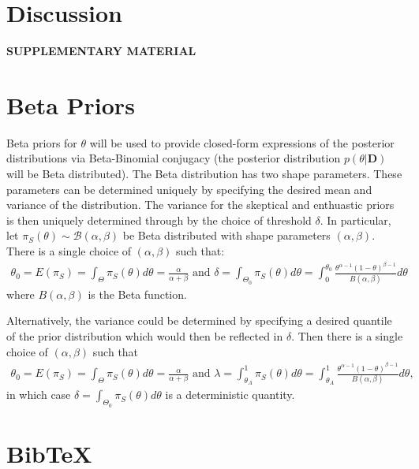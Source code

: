 \documentclass[12pt]{article}
\begin{document}
\section{Discussion}
%





\newpage
\begin{center}
{\large\bf SUPPLEMENTARY MATERIAL}
\end{center}
\section{Beta Priors}
Beta priors for $\theta$ will be used to provide closed-form expressions of the posterior distributions via Beta-Binomial conjugacy (the posterior distribution $p(\theta|\mathbf{D})$ will be Beta distributed). The Beta distribution has two shape parameters. These parameters can be determined uniquely by specifying the desired mean and variance of the distribution.  The variance for the skeptical and enthuastic priors is then uniquely determined through by the choice of threshold $\delta$. In particular, let $\pi_S(\theta)\sim \mathcal{B}(\alpha,\beta)$ be Beta distributed with shape parameters $(\alpha,\beta)$. There is a single choice of $(\alpha,\beta)$ such that:
\begin{align*}
\theta_0=E(\pi_S)=\int_{\Theta}\pi_S(\theta)d\theta=\frac{\alpha}{\alpha+\beta}\text{ and }\delta=\int_{\Theta_0}\pi_S(\theta)d\theta=\int_{0}^{\theta_0}\frac{\theta^{\alpha-1}(1-\theta)^{\beta-1}}{B(\alpha,\beta)}d\theta
\end{align*}
where $B(\alpha,\beta)$ is the Beta function.

Alternatively, the variance could be determined by specifying a desired quantile of the prior distribution which would then be reflected in $\delta$.  Then there is a single choice of $(\alpha,\beta)$ such that
\begin{align*}
\theta_0=E(\pi_S)=\int_{\Theta}\pi_S(\theta)d\theta=\frac{\alpha}{\alpha+\beta}\text{ and }\lambda=\int_{\theta_A}^{1}\pi_S(\theta)d\theta=\int_{\theta_A}^{1}\frac{\theta^{\alpha-1}(1-\theta)^{\beta-1}}{B(\alpha,\beta)}d\theta,
\end{align*}
in which case $\delta=\int_{\Theta_0}\pi_S(\theta)d\theta$ is a deterministic quantity.
\section{BibTeX}

 
 		
\end{document}
